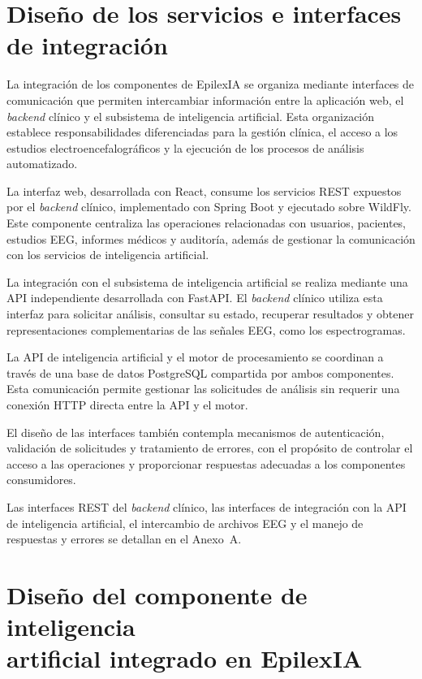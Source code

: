\section{Diseño de los servicios e interfaces de integración}
\label{sec:diseno-servicios-integracion}

La integración de los componentes de EpilexIA se organiza
mediante interfaces de comunicación que permiten intercambiar
información entre la aplicación web, el \textit{backend} clínico y
el subsistema de inteligencia artificial. Esta organización
establece responsabilidades diferenciadas para la gestión
clínica, el acceso a los estudios electroencefalográficos
y la ejecución de los procesos de análisis automatizado.

La interfaz web, desarrollada con React, consume los servicios
REST expuestos por el \textit{backend} clínico, implementado con
Spring Boot y ejecutado sobre WildFly. Este componente
centraliza las operaciones relacionadas con usuarios,
pacientes, estudios EEG, informes médicos y auditoría,
además de gestionar la comunicación con los servicios
de inteligencia artificial.

La integración con el subsistema de inteligencia artificial
se realiza mediante una API independiente desarrollada
con FastAPI. El \textit{backend} clínico utiliza esta interfaz
para solicitar análisis, consultar su estado, recuperar
resultados y obtener representaciones complementarias
de las señales EEG, como los espectrogramas.

La API de inteligencia artificial y el motor de procesamiento
se coordinan a través de una base de datos PostgreSQL
compartida por ambos componentes. Esta comunicación permite
gestionar las solicitudes de análisis sin requerir una
conexión HTTP directa entre la API y el motor.

El diseño de las interfaces también contempla mecanismos
de autenticación, validación de solicitudes y tratamiento
de errores, con el propósito de controlar el acceso a
las operaciones y proporcionar respuestas adecuadas
a los componentes consumidores.

\begin{nuevotexto}
Las interfaces REST del \textit{backend} clínico, las interfaces de integración con la API de inteligencia artificial, el intercambio de archivos EEG y el manejo de respuestas y errores se detallan en el Anexo~A.
\end{nuevotexto}

\section[Diseño del componente de inteligencia artificial integrado en EpilexIA]{Diseño del componente de inteligencia\\artificial integrado en EpilexIA}
\label{sec:diseno-componente-ia}


